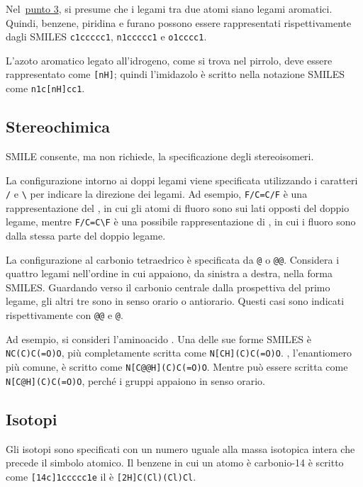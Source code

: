 Nel~\hyperref[it:smilesArom]{punto 3}, si presume che i legami tra due atomi siano legami aromatici. Quindi, benzene, piridina e furano possono essere rappresentati rispettivamente dagli SMILES \verb|c1ccccc1|, \verb|n1ccccc1| e \verb|o1cccc1|.

L'azoto aromatico legato all'idrogeno, come si trova nel pirrolo, deve essere rappresentato come \verb|[nH]|; quindi l'imidazolo è scritto nella notazione SMILES come \verb|n1c[nH]cc1|.

\subsection*{Stereochimica}
SMILE consente, ma non richiede, la specificazione degli stereoisomeri.

La configurazione intorno ai doppi legami viene specificata utilizzando i caratteri \verb|/| e \texttt{\textbackslash}  per indicare la direzione dei legami. Ad esempio, \verb|F/C=C/F| è una rappresentazione del , in cui gli atomi di fluoro sono sui lati opposti del doppio legame, mentre \texttt{F/C=C\textbackslash F} è una possibile rappresentazione di , in cui i fluoro sono dalla stessa parte del doppio legame.

La configurazione al carbonio tetraedrico è specificata da \verb|@| o \verb|@@|. Considera i quattro legami nell'ordine in cui appaiono, da sinistra a destra, nella forma SMILES. Guardando verso il carbonio centrale dalla prospettiva del primo legame, gli altri tre sono in senso orario o antiorario. Questi casi sono indicati rispettivamente con \verb|@@| e \verb|@|.

Ad esempio, si consideri l'aminoacido . Una delle sue forme SMILES è \verb|NC(C)C(=O)O|, più completamente scritta come \verb|N[CH](C)C(=O)O|. , l'enantiomero più comune, è scritto come \verb|N[C@@H](C)C(=O)O|. Mentre  può essere scritta come \verb|N[C@H](C)C(=O)O|, perché i gruppi appaiono in senso orario.

\subsection*{Isotopi}
Gli isotopi sono specificati con un numero uguale alla massa isotopica intera che precede il simbolo atomico. Il benzene in cui un atomo è carbonio-14 è scritto come \verb|[14c]1ccccc1e| il  è \verb|[2H]C(Cl)(Cl)Cl|.

